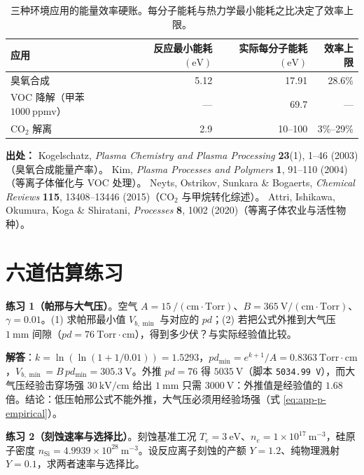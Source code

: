 \begin{table}[htbp]
  \centering
  \small
  \caption{三种环境应用的能量效率硬账。每分子能耗与热力学最小能耗之比决定了效率上限。}
  \label{tab:app-p-env}
  \begin{tabular}{@{}lrrr@{}}
    \toprule
    应用 & 反应最小能耗 $(\mathrm{eV})$ & 实际每分子能耗 $(\mathrm{eV})$ & 效率上限 \\
    \midrule
    臭氧合成 & 5.12 & 17.91 & 28.6\% \\
    VOC 降解（甲苯 $1000\ \mathrm{ppmv}$） & --- & 69.7 & --- \\
    $\mathrm{CO_2}$ 解离 & 2.9 & 10--100 & 3\%--29\% \\
    \bottomrule
  \end{tabular}
\end{table}

{\footnotesize
\textbf{出处：} Kogelschatz, \emph{Plasma Chemistry and Plasma Processing} \textbf{23}(1), 1--46 (2003)（臭氧合成能量产率）。
Kim, \emph{Plasma Processes and Polymers} \textbf{1}, 91--110 (2004)（等离子体催化与 VOC 处理）。
Neyts, Ostrikov, Sunkara \& Bogaerts, \emph{Chemical Reviews} \textbf{115}, 13408--13446 (2015)（$\mathrm{CO_2}$ 与甲烷转化综述）。
Attri, Ishikawa, Okumura, Koga \& Shiratani, \emph{Processes} \textbf{8}, 1002 (2020)（等离子体农业与活性物种）。
}

\section{六道估算练习}
\label{sec:app-p-problems}


\textbf{练习 1（帕邢与大气压）}。空气 $A=15\ \mathrm{/(cm\cdot Torr)}$、$B=365\ \mathrm{V/(cm\cdot Torr)}$、$\gamma=0.01$。(1) 求帕邢最小值 $V_{b,\min}$ 与对应的 $pd$；(2) 若把公式外推到大气压 $1\ \mathrm{mm}$ 间隙（$pd=76\ \mathrm{Torr\cdot cm}$），得到多少伏？与实际经验值比较。

\textbf{解答}：$k=\ln(\ln(1+1/0.01))=1.5293$，$pd_{\min}=e^{k+1}/A = 0.8363\ \mathrm{Torr\cdot cm}$，$V_{b,\min}=B\,pd_{\min}=305.3\ \mathrm{V}$。外推 $pd=76$ 得 $5035\ \mathrm{V}$（脚本 \texttt{5034.99 V}），而大气压经验击穿场强 $30\ \mathrm{kV/cm}$ 给出 $1\ \mathrm{mm}$ 只需 $3000\ \mathrm{V}$：外推值是经验值的 $1.68$ 倍。结论：低压帕邢公式不能外推，大气压必须用经验场强（式 \eqref{eq:app-p-empirical}）。

\textbf{练习 2（刻蚀速率与选择比）}。刻蚀基准工况 $T_e=3\ \mathrm{eV}$、$n_e=1\times10^{17}\ \mathrm{m}^{-3}$，硅原子密度 $n_{\mathrm{Si}}=4.9939\times10^{28}\ \mathrm{m}^{-3}$。设反应离子刻蚀的产额 $Y=1.2$、纯物理溅射 $Y=0.1$，求两者速率与选择比。

